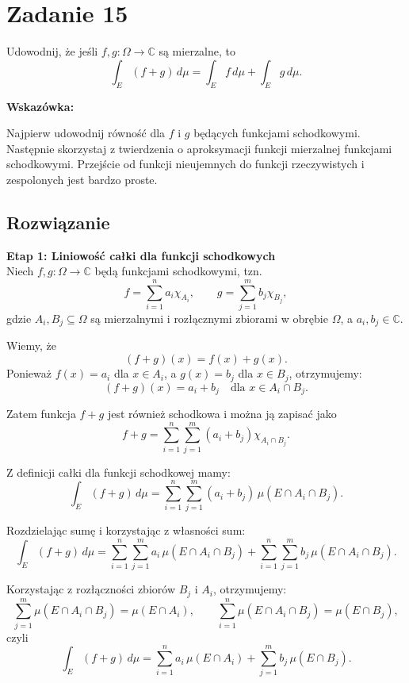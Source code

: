 \section{Zadanie 15}

Udowodnij, że jeśli \(f, g : \Omega \to \mathbb{C}\) są mierzalne, to
\[
	\int_E (f + g) \, d\mu = \int_E f \, d\mu + \int_E g \, d\mu.
\]

\textbf{Wskazówka:}

Najpierw udowodnij równość dla \(f\) i \(g\) będących funkcjami schodkowymi.
Następnie skorzystaj z twierdzenia o aproksymacji funkcji mierzalnej funkcjami schodkowymi.
Przejście od funkcji nieujemnych do funkcji rzeczywistych i zespolonych jest bardzo proste.

\subsection*{Rozwiązanie}
\textbf{Etap 1: Liniowość całki dla funkcji schodkowych}
\\

Niech \(f, g : \Omega \to \mathbb{C}\) będą funkcjami schodkowymi, tzn.
\[
	f = \sum_{i=1}^{n} a_i \chi_{A_i}, \qquad
	g = \sum_{j=1}^{m} b_j \chi_{B_j},
\]
gdzie \(A_i, B_j \subseteq \Omega\) są mierzalnymi i rozłącznymi zbiorami w obrębie \(\Omega\), a \(a_i, b_j \in \mathbb{C}\).

Wiemy, że
\[
	(f+g)(x) = f(x) + g(x).
\]
Ponieważ \(f(x) = a_i\) dla \(x \in A_i\), a \(g(x) = b_j\) dla \(x \in B_j\), otrzymujemy:
\[
	(f+g)(x) = a_i + b_j \quad \text{dla } x \in A_i \cap B_j.
\]

Zatem funkcja \(f+g\) jest również schodkowa i można ją zapisać jako
\[
	f + g = \sum_{i=1}^{n} \sum_{j=1}^{m} (a_i + b_j) \chi_{A_i \cap B_j}.
\]

Z definicji całki dla funkcji schodkowej mamy:
\[
	\int_E (f+g)\, d\mu = \sum_{i=1}^{n} \sum_{j=1}^{m} (a_i + b_j) \, \mu(E \cap A_i \cap B_j).
\]

Rozdzielając sumę i korzystając z własności sum:
\[
	\int_E (f+g)\, d\mu
	= \sum_{i=1}^{n} \sum_{j=1}^{m} a_i \, \mu(E \cap A_i \cap B_j)
	+ \sum_{i=1}^{n} \sum_{j=1}^{m} b_j \, \mu(E \cap A_i \cap B_j).
\]

Korzystając z rozłączności zbiorów \(B_j\) i \(A_i\), otrzymujemy:
\[
	\sum_{j=1}^{m} \mu(E \cap A_i \cap B_j) = \mu(E \cap A_i), \qquad
	\sum_{i=1}^{n} \mu(E \cap A_i \cap B_j) = \mu(E \cap B_j),
\]
czyli
\[
	\int_E (f+g)\, d\mu = \sum_{i=1}^{n} a_i \, \mu(E \cap A_i) + \sum_{j=1}^{m} b_j \, \mu(E \cap B_j).
\]

